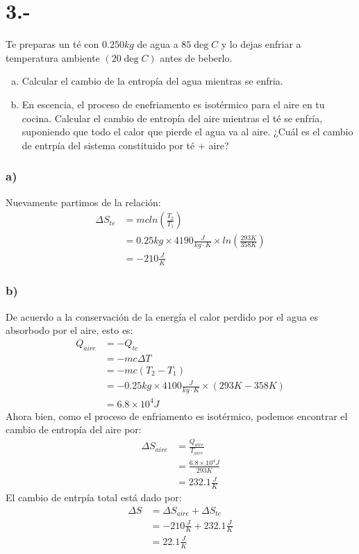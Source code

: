 \documentclass{article}
\begin{document}
\section*{3.-}
Te preparas un té con $0.250kg$ de agua a $85 \deg C$ y lo dejas enfriar a temperatura ambiente
$(20\deg C)$ antes de beberlo.
\begin{enumerate}[a)]
    \item Calcular el cambio de la entropía del agua mientras se enfria.
    \item En escencia, el proceso de enefriamento es isotérmico para el aire en tu cocina. Calcular el cambio 
    de entropía del aire mientras el té se enfría, suponiendo que todo el calor que pierde el agua va al aire.
    ¿Cuál es el cambio de entrpía del sistema constituido por té + aire?
\end{enumerate}
\begin{tcolorbox}[breakable]
    \subsubsection*{a)}
    Nuevamente partimos de la relación:
    \begin{align*}
        \Delta S_{te}
        &= mcln(\tfrac{T_2}{T_1}) \\
        &= 0.25kg \times 4190 \tfrac{J}{kg \cdot K} \times ln(\tfrac{293K}{358K}) \\
        &= -210\tfrac{J}{K}
    \end{align*}
    \subsubsection*{b)}
    De acuerdo a la conservación de la energía el calor perdido por el agua 
    es absorbodo por el aire, esto es:
    \begin{align*}
        Q_{aire} 
        &= -Q_{te} \\
        &= -mc\Delta T \\
        &= -mc(T_2-T_1) \\
        &= -0.25kg \times 4100 \tfrac{J}{kg \cdot K} \times (293K-358K) \\
        &= 6.8 \times 10^4 J
    \end{align*}
    Ahora bien, como el proceso de enfriamento es isotérmico, podemos encontrar 
    el cambio de entropía del aire por:
    \begin{align*}
        \Delta S_{aire} 
        &= \tfrac{Q_{aire}}{T_{aire}} \\
        &= \tfrac{6.8 \times 10^4J}{293 K} \\
        &= 232.1 \tfrac{J}{K} 
    \end{align*}
    El cambio de entrpía total está dado por:
    \begin{align*}
        \Delta S 
        &= \Delta S_{aire} + \Delta S_{te} \\
        &= -210 \tfrac{J}{K} + 232.1 \tfrac{J}{K} \\
        &= 22.1 \tfrac{J}{K}
    \end{align*}
\end{tcolorbox}
\end{document}
